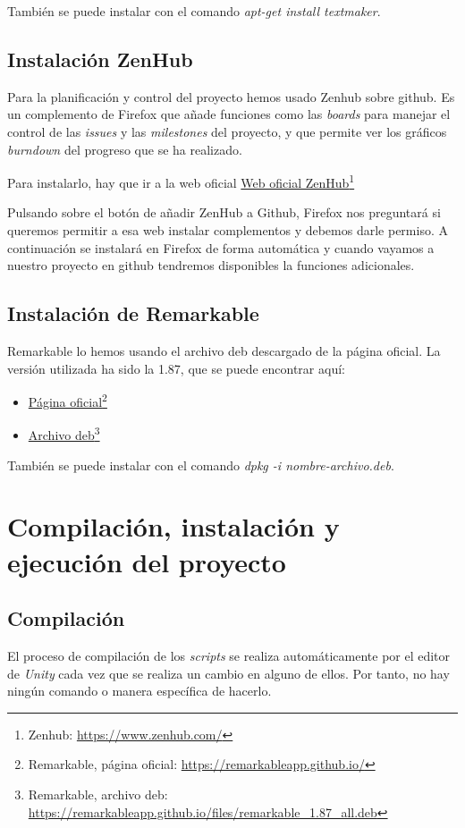 También se puede instalar con el comando \textit{apt-get install textmaker}.

\subsection{Instalación ZenHub}

Para la planificación y control del proyecto hemos usado Zenhub sobre github. Es un complemento de Firefox que añade funciones como las \textit{boards} para manejar el control de las \textit{issues} y las \textit{milestones} del proyecto, y que permite ver los gráficos \textit{burndown} del progreso que se ha realizado.

Para instalarlo, hay que ir a la web oficial
\href{https://www.zenhub.com/}{Web oficial ZenHub}\footnote{Zenhub: \url{https://www.zenhub.com/}}

Pulsando sobre el botón de añadir ZenHub a Github, Firefox nos preguntará si queremos permitir a esa web instalar complementos y debemos darle permiso. A continuación se instalará en Firefox de forma automática y cuando vayamos a nuestro proyecto en github tendremos disponibles la funciones adicionales.

\subsection{Instalación de Remarkable}
Remarkable lo hemos usando el archivo deb descargado de la página oficial. La versión utilizada ha sido la 1.87, que se puede encontrar aquí:

\begin{itemize}
\item \href{https://remarkableapp.github.io/}{Página oficial}\footnote{Remarkable, página oficial: \url{https://remarkableapp.github.io/}}
\item \href{https://remarkableapp.github.io/files/remarkable_1.87_all.deb
}{Archivo deb}\footnote{Remarkable, archivo deb: \url{https://remarkableapp.github.io/files/remarkable_1.87_all.deb}}
\end{itemize}

También se puede instalar con el comando \textit{dpkg -i nombre-archivo.deb}.

\section{Compilación, instalación y ejecución del proyecto}
\subsection{Compilación}
El proceso de compilación de los \textit{scripts} se realiza automáticamente por el editor de \textit{Unity} cada vez que se realiza un cambio en alguno de ellos. Por tanto, no hay ningún comando o manera específica de hacerlo.

